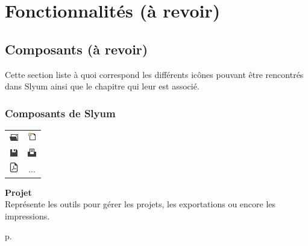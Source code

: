 
\chapter{Fonctionnalités (à revoir)}

\section*{Composants (à revoir)}

Cette section liste à quoi correspond les différents icônes pouvant être rencontrés dans Slyum ainsi que le chapitre qui leur est associé.

\subsection*{Composants de Slyum}


\begin{minipage}[c]{.2\textwidth}
	\begin{rightborder}\begin{tabular}{cc}
		\includegraphics{images/icon/open.png} &
		\includegraphics{images/icon/new.png} \\
		\includegraphics{images/icon/save.png} &
		\includegraphics{images/icon/print.png} \\
		\includegraphics{images/icon/pdf-16.png} &
		... \\
	\end{tabular}\end{rightborder}
\end{minipage}
\begin{minipage}[c]{.1\textwidth}\end{minipage}
\begin{minipage}[c]{.6\textwidth}
	\textbf{Projet} \\
	Représente les outils pour gérer les projets, les exportations ou encore les impressions.
\end{minipage}
\begin{minipage}[c]{.1\textwidth}
	\hfill
	p.{\LARGE \pageref{sec:projet}}
\end{minipage}

